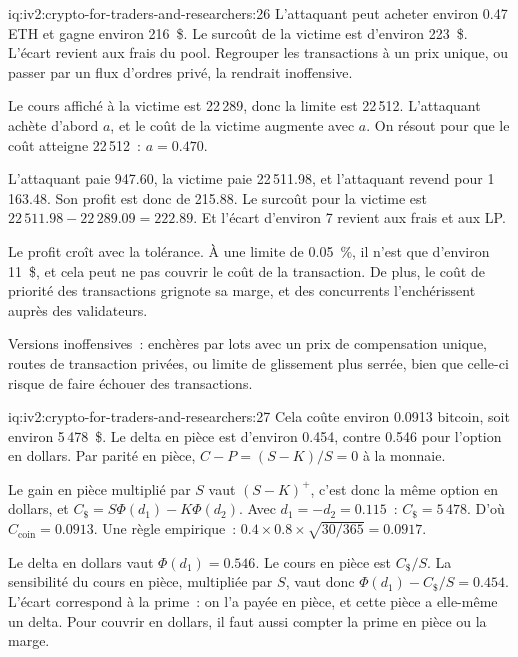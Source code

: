 \begin{solution}{iq:iv2:crypto-for-traders-and-researchers:26}
L'attaquant peut acheter environ 0.47 ETH et gagne environ 216~\$. Le surcoût de la victime est d'environ 223~\$. L'écart revient aux frais du pool. Regrouper les transactions à un prix unique, ou passer par un flux d'ordres privé, la rendrait inoffensive.

Le cours affiché à la victime est 22\,289, donc la limite est 22\,512. L'attaquant achète d'abord $a$, et le coût de la victime augmente avec $a$. On résout pour que le coût atteigne 22\,512~: $a = 0.470$.

L'attaquant paie 947.60, la victime paie 22\,511.98, et l'attaquant revend pour 1\,163.48. Son profit est donc de 215.88. Le surcoût pour la victime est $22\,511.98 - 22\,289.09 = 222.89$. Et l'écart d'environ 7 revient aux frais et aux LP.

Le profit croît avec la tolérance. À une limite de 0.05~\%, il n'est que d'environ 11~\$, et cela peut ne pas couvrir le coût de la transaction. De plus, le coût de priorité des transactions grignote sa marge, et des concurrents l'enchérissent auprès des validateurs.

Versions inoffensives~: enchères par lots avec un prix de compensation unique, routes de transaction privées, ou limite de glissement plus serrée, bien que celle-ci risque de faire échouer des transactions.

\end{solution}

\begin{solution}{iq:iv2:crypto-for-traders-and-researchers:27}
Cela coûte environ 0.0913 bitcoin, soit environ 5\,478~\$. Le delta en pièce est d'environ 0.454, contre 0.546 pour l'option en dollars. Par parité en pièce, $C - P = (S - K)/S = 0$ à la monnaie.

Le gain en pièce multiplié par $S$ vaut $(S - K)^+$, c'est donc la même option en dollars, et $C_{\$} = S\Phi(d_1) - K\Phi(d_2)$. Avec $d_1 = -d_2 = 0.115$~: $C_{\$} = 5\,478$. D'où $C_{\text{coin}} = 0.0913$. Une règle empirique~: $0.4 \times 0.8 \times \sqrt{30/365} = 0.0917$.

Le delta en dollars vaut $\Phi(d_1) = 0.546$. Le cours en pièce est $C_{\$}/S$. La sensibilité du cours en pièce, multipliée par $S$, vaut donc $\Phi(d_1) - C_{\$}/S = 0.454$. L'écart correspond à la prime~: on l'a payée en pièce, et cette pièce a elle-même un delta. Pour couvrir en dollars, il faut aussi compter la prime en pièce ou la marge.

\end{solution}

